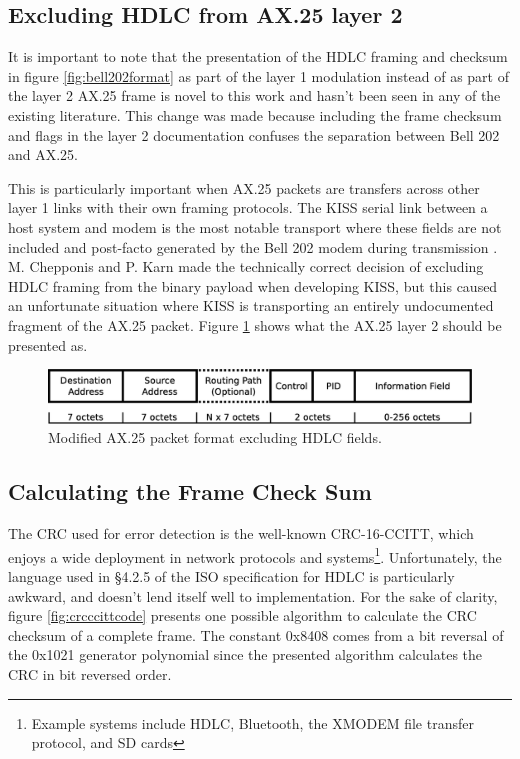 \documentclass[12pt,letterpaper]{article}
\begin{document}
\begin{itemize}
\end{itemize}

\subsection{Excluding HDLC from AX.25 layer 2}

It is important to note that the presentation of the HDLC framing
and checksum
in figure \ref{fig:bell202format} as part of the layer 1 modulation 
instead of as part of the layer 2 AX.25 frame is 
novel to this work and hasn't been seen in any of the existing literature.
This change was made because including the frame checksum and flags
in the layer 2 documentation confuses the separation between Bell 202 
and AX.25. 

This is particularly important when AX.25 packets are transfers across 
other layer 1 links with their own framing protocols.
The KISS serial link between a host system and modem is the most notable
transport where these fields are not included and post-facto generated by the
Bell 202 modem during transmission \cite{KISSspec}.
M. Chepponis and P. Karn made the technically correct decision of excluding 
HDLC framing from the binary payload when developing KISS, but this caused
an unfortunate situation where KISS is transporting an entirely
undocumented fragment of the AX.25 packet. Figure \ref{fig:ax25format} 
shows what the AX.25 layer 2 should be presented as.

\begin{figure}
	\centering
	\includegraphics[width=1.0\textwidth]{src/dia/ax25}
	\caption{Modified AX.25 packet format excluding HDLC fields.}
	\label{fig:ax25format}
\end{figure}

\subsection{Calculating the Frame Check Sum}
\label{calcfcs}


The CRC used for error detection is the well-known CRC-16-CCITT, which
enjoys a wide deployment in network protocols and 
systems\footnote{Example systems include HDLC, Bluetooth, the XMODEM file 
transfer protocol, and SD cards}.
Unfortunately, the language used in \S4.2.5 of the ISO specification for
HDLC \cite{iso13239} is particularly awkward, 
and doesn't lend itself well to implementation.
For the sake of clarity, figure \ref{fig:crcccittcode} 
presents one possible algorithm to
calculate the CRC checksum of a complete frame.
The constant 0x8408 comes from a bit reversal of the 0x1021 generator polynomial
since the presented algorithm calculates the CRC in bit reversed order.
\end{document}
